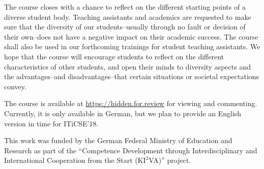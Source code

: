 \documentclass[sigconf,screen]{acmart}
\begin{document}
The course closes with a chance to reflect on the different starting points of a diverse
student body. Teaching assistants and academics are requested to make sure that the diversity of our
students--usually through no fault or decision of their own--does not have a negative
impact on their academic success. The course shall also be used in our forthcoming
trainings for student teaching assistants. We hope that the course will encourage students to reflect
on the different characteristics of other students, and open their minds to diversity aspects and the
advantages--and disadvantages--that certain situations or societal expectations convey.

The course is available at \url{https://hidden.for.review} for viewing and commenting. Currently, it is
only available in German, but we plan to provide an English version in time for ITiCSE'18.


\begin{acks}
This work was funded by the German Federal Ministry of Education and Research as part of the 
``Competence Development through Interdisciplinary and International Cooperation from the Start
(K$\mathrm{I^2}$VA)'' project.
\end{acks}


%
\end{document}
